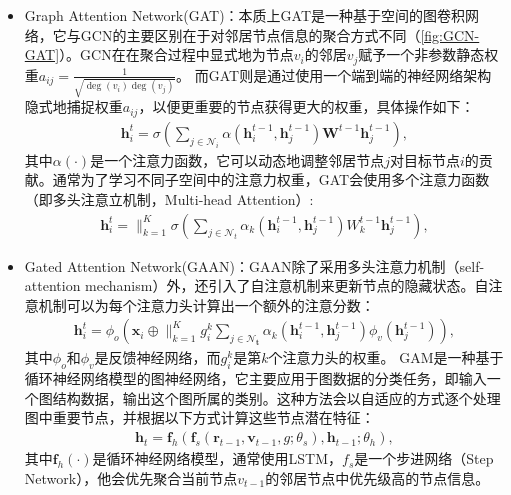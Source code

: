 \begin{itemize}
    \item Graph Attention Network(GAT)\cite{velivckovic2017graph}：本质上GAT是一种基于空间的图卷积网络，它与GCN的主要区别在于对邻居节点信息的聚合方式不同（\autoref{fig:GCN-GAT}）。GCN在在聚合过程中显式地为节点$v_i$的邻居$v_j$赋予一个非参数静态权重$a_{ij}=\frac{1}{\sqrt{\operatorname{deg}\left(v_{i}\right) \operatorname{deg}\left(v_{j}\right)}}$。
    而GAT则是通过使用一个端到端的神经网络架构隐式地捕捉权重$a_{ij}$，以便更重要的节点获得更大的权重，具体操作如下：
    \begin{align}
        \mathbf{h}_{i}^{t}=\sigma\left(\sum_{j \in \mathcal{N}_{i}} \alpha\left(\mathbf{h}_{i}^{t-1}, \mathbf{h}_{j}^{t-1}\right) \mathbf{W}^{t-1} \mathbf{h}_{j}^{t-1}\right),
    \end{align}
    其中$\alpha(\cdot)$是一个注意力函数，它可以动态地调整邻居节点$j$对目标节点$i$的贡献。通常为了学习不同子空间中的注意力权重，GAT会使用多个注意力函数（即多头注意立机制，Multi-head Attention）:
    \begin{align}
        \mathbf{h}_{i}^{t}=\|_{k=1}^{K} \sigma\left(\sum_{j \in \mathcal{N}_{t}} \alpha_{k}\left(\mathbf{h}_{i}^{t-1}, \mathbf{h}_{j}^{t-1}\right) W_{k}^{t-1} \mathbf{h}_{j}^{t-1}\right),
    \end{align}

    \item Gated Attention Network(GAAN)\cite{lee2017deep}\cite{zhang2018gaan}：GAAN除了采用多头注意力机制（self-attention mechanism）外，还引入了自注意机制来更新节点的隐藏状态。自注意机制可以为每个注意力头计算出一个额外的注意分数：
    \begin{align}
        \mathbf{h}_{i}^{t}=\phi_{o}\left(\mathbf{x}_{i} \oplus \|_{k=1}^{K} g_{i}^{k} \sum_{j \in \mathcal{N}_{\mathbf{t}}} \alpha_{k}\left(\mathbf{h}_{i}^{t-1}, \mathbf{h}_{j}^{t-1}\right) \phi_{v}\left(\mathbf{h}_{j}^{t-1}\right)\right),
    \end{align}
    其中$\phi_{o}\text{和}\phi_{v}$是反馈神经网络，而$g_{i}^{k}$是第$k$个注意力头的权重。
    GAM是一种基于循环神经网络模型的图神经网络，它主要应用于图数据的分类任务，即输入一个图结构数据，输出这个图所属的类别。这种方法会以自适应的方式逐个处理图中重要节点，并根据以下方式计算这些节点潜在特征：
    \begin{align}
        \mathbf{h}_{t}=\mathbf{f}_{h}\left(\mathbf{f}_{s}\left(\mathbf{r}_{t-1}, \mathbf{v}_{t-1}, g ; \theta_{s}\right), \mathbf{h}_{t-1} ; \theta_{h}\right),
    \end{align}
    其中$\mathbf{f}_{h}(\cdot)$是循环神经网络模型，通常使用LSTM，$f_s$是一个步进网络（Step Network），他会优先聚合当前节点$v_{t-1}$的邻居节点中优先级高的节点信息。
\end{itemize}
